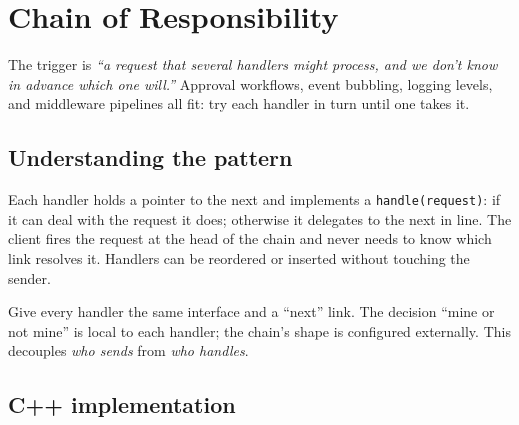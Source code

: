 \section{Chain of Responsibility}
\label{sec:pat-chain}


\begin{patternbox}
The trigger is \emph{``a request that several handlers might process, and
we don't know in advance which one will.''} Approval workflows, event
bubbling, logging levels, and middleware pipelines all fit: try each
handler in turn until one takes it.
\end{patternbox}

\subsection*{Understanding the pattern}

Each handler holds a pointer to the next and implements a
\texttt{handle(request)}: if it can deal with the request it does;
otherwise it delegates to the next in line. The client fires the request
at the head of the chain and never needs to know which link resolves it.
Handlers can be reordered or inserted without touching the sender.

\begin{ideabox}
Give every handler the same interface and a ``next'' link. The decision
``mine or not mine'' is local to each handler; the chain's shape is
configured externally. This decouples \emph{who sends} from \emph{who
handles}.
\end{ideabox}

\subsection*{C++ implementation}

